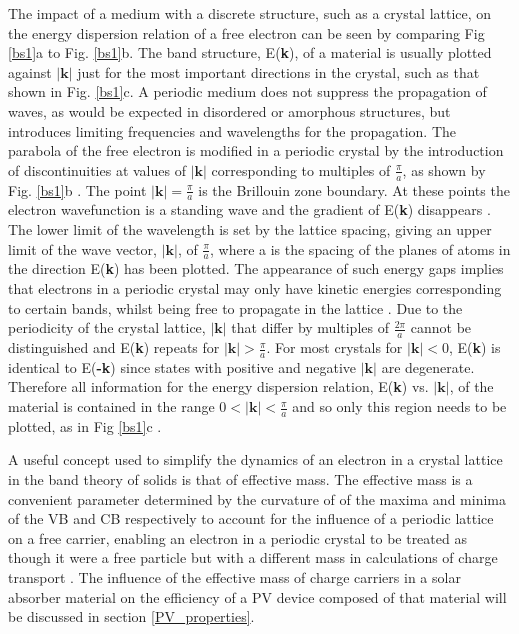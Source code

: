\documentclass[11pt, twoside]{report}
\begin{document}
The impact of a medium with a discrete structure, such as a crystal lattice, on the energy dispersion relation of a free electron can be seen by comparing Fig \ref{bs1}a to Fig. \ref{bs1}b.
The band structure, E(\textbf{k}), of a material is usually plotted against $|\textbf{k}|$ just for the most important directions in the crystal, such as that shown in Fig. \ref{bs1}c. A periodic medium does not suppress the propagation of waves, as would be expected in disordered or amorphous structures, but introduces limiting frequencies and wavelengths for the propagation. 
The parabola of the free electron is modified in a periodic crystal by the introduction of discontinuities at values of $|\textbf{k}|$ corresponding to multiples of $\frac{\pi}{a}$, as shown by Fig. \ref{bs1}b \cite{small_semiconductor2}. The point $|\textbf{k}| = \frac{\pi}{a}$ is the Brillouin zone boundary. At these points the electron wavefunction is a standing wave and the gradient of E(\textbf{k}) disappears \cite{Nelson3}.
The lower limit of the wavelength is set by the lattice spacing, giving an upper limit of the wave vector, $|\textbf{k}|$, of $\frac{\pi}{a}$, where a is the spacing of the planes of atoms in the direction E(\textbf{k}) has been plotted.  The appearance of such energy gaps implies that electrons in a periodic crystal may only have kinetic energies corresponding to certain bands, whilst being free to propagate in the lattice \cite{small_semiconductor2}. 
Due to the periodicity of the crystal lattice, $|\textbf{k}|$  that differ by multiples of $\frac{2\pi}{a}$ cannot be distinguished and E(\textbf{k}) repeats for $|\textbf{k}| > \frac{\pi}{a}$. For most crystals for $|\textbf{k}| < 0$, E(\textbf{k}) is identical to E(\textbf{-k}) since states with positive and negative $|\textbf{k}|$ are degenerate. Therefore all information for the energy dispersion relation, E(\textbf{k}) vs. $|\textbf{k}|$, of the material is contained in the range $0 < |\textbf{k}| < \frac{\pi}{a}$ and so only this region needs to be plotted, as in Fig \ref{bs1}c \cite{Nelson3}. 

A useful concept used to simplify the dynamics of an electron in a crystal lattice in the band theory of solids is that of effective mass. The effective mass is a convenient parameter determined by the curvature of of the maxima and minima of the VB and CB respectively to account for the influence of a periodic lattice on a free carrier, enabling an electron in a periodic crystal to be treated as though it were a free particle but with a different mass in calculations of charge transport \cite{small_semiconductor2}.
The influence of the effective mass of charge carriers in a solar absorber material on the efficiency of a PV device composed of that material will be discussed in section \ref{PV_properties}.
\end{document}
